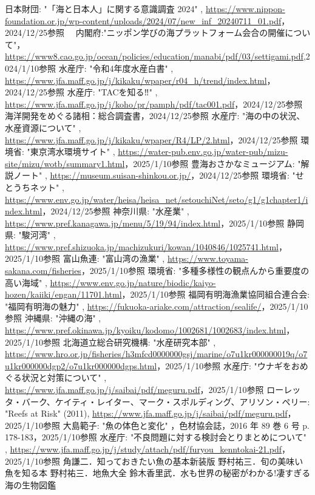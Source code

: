 \documentclass[12pt,a4j,titlepage]{ltjsarticle}
\begin{document}
\begin{thebibliography}{99}
  日本財団: "「海と日本人」に関する意識調査 2024" , \url{https://www.nippon-foundation.or.jp/wp-content/uploads/2024/07/new_inf_20240711_01.pdf}，2024/12/25参照
　内閣府:"ニッポン学びの海プラットフォーム会合の開催について"，\url{https://www8.cao.go.jp/ocean/policies/education/manabi/pdf/03/settigami.pdf},2024/1/10参照
  水産庁: "令和4年度水産白書" , \url{https://www.jfa.maff.go.jp/j/kikaku/wpaper/r04_h/trend/index.html}，2024/12/25参照
  水産庁: "TACを知る‼︎" , \url{https://www.jfa.maff.go.jp/j/koho/pr/pamph/pdf/tac001.pdf}，2024/12/25参照
  海洋開発をめぐる諸相：総合調査書，2024/12/25参照
  水産庁: "海の中の状況、水産資源について" , \url{https://www.jfa.maff.go.jp/j/kikaku/wpaper/R4/LP/2.html}，2024/12/25参照
  環境省: "東京湾水環境サイト" , \url{https://water-pub.env.go.jp/water-pub/mizu-site/mizu/wotb/summary1.html}，2025/1/10参照
  豊海おさかなミュージアム: "解説ノート" , \url{https://museum.suisan-shinkou.or.jp/}，2024/12/25参照
  環境省: "せとうちネット" , \url{https://www.env.go.jp/water/heisa/heisa_net/setouchiNet/seto/g1/g1chapter1/index.html}，2024/12/25参照
  神奈川県: "水産業" , \url{https://www.pref.kanagawa.jp/menu/5/19/94/index.html}，2025/1/10参照
  静岡県: "駿河湾" , \url{https://www.pref.shizuoka.jp/machizukuri/kowan/1040846/1025741.html}，2025/1/10参照
  富山魚連: "富山湾の漁業" , \url{https://www.toyama-sakana.com/fisheries}，2025/1/10参照
  環境省: "多種多様性の観点んから重要度の高い海域" , \url{https://www.env.go.jp/nature/biodic/kaiyo-hozen/kaiiki/engan/11701.html}，2025/1/10参照
  福岡有明海漁業協同組合連合会: "福岡有明海の魅力" , \url{https://fukuoka-ariake.com/attraction/sealife/}，2025/1/10参照
  沖縄県: "沖縄の海" , \url{https://www.pref.okinawa.jp/kyoiku/kodomo/1002681/1002683/index.html}，2025/1/10参照
  北海道立総合研究機構: "水産研究本部" , \url{https://www.hro.or.jp/fisheries/h3mfcd0000000gsj/marine/o7u1kr000000019q/o7u1kr000000dgp2/o7u1kr000000dgps.html}，2025/1/10参照
  水産庁: "ウナギをおめぐる状況と対策について" , \url{https://www.jfa.maff.go.jp/j/saibai/pdf/meguru.pdf}，2025/1/10参照
  ローレッタ・バーク、ケイティ・レイター、マーク・スポルディング、アリソン・ペリー: "Reefs at Risk" (2011), \url{https://www.jfa.maff.go.jp/j/saibai/pdf/meguru.pdf}，2025/1/10参照
  大島範子: "魚の体色と変化"  ，色材協会誌，2016 年 89 巻 6 号 p. 178-183，2025/1/10参照
  水産庁: "不良問題に対する検討会とりまとめについて" , \url{https://www.jfa.maff.go.jp/j/study/attach/pdf/furyou_kenntokai-21.pdf}，2025/1/10参照
 角謙二．知っておきたい魚の基本新装版
\bibitem{} 野村祐三．旬の美味い魚を知る本
\bibitem{} 野村祐三．地魚大全
 鈴木香里武．水も世界の秘密がわかる!凄すぎる海の生物図鑑
\end{thebibliography}
\end{document}
